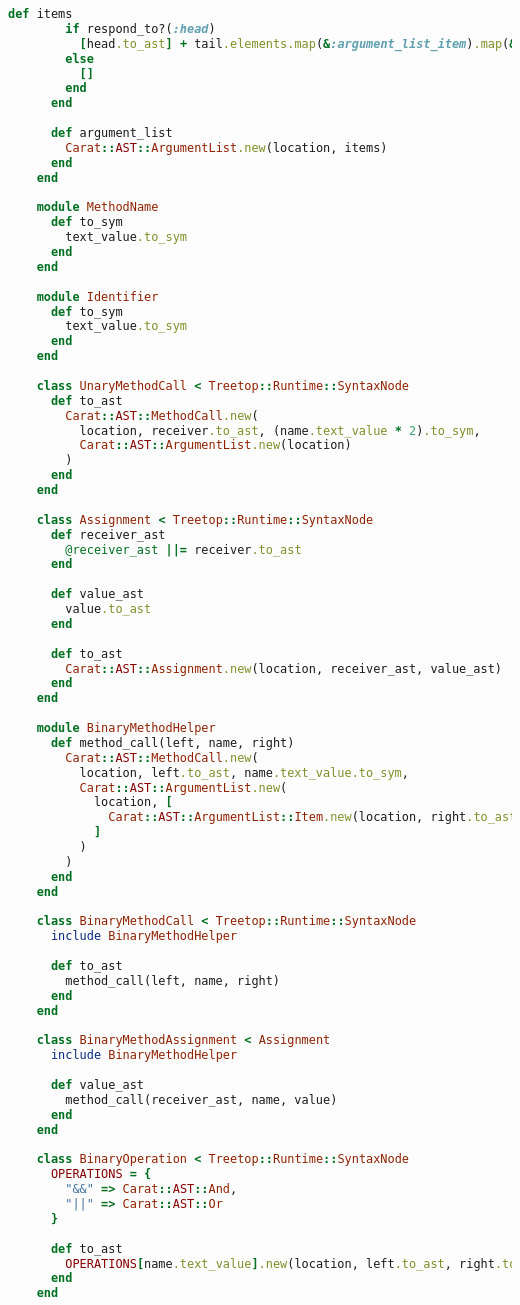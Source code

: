 \begin{lstlisting}[title={\small\ttfamily\bfseries parser/nodes.rb},language=Ruby]
      def items
        if respond_to?(:head)
          [head.to_ast] + tail.elements.map(&:argument_list_item).map(&:to_ast)
        else
          []
        end
      end
      
      def argument_list
        Carat::AST::ArgumentList.new(location, items)
      end
    end
    
    module MethodName
      def to_sym
        text_value.to_sym
      end
    end
    
    module Identifier
      def to_sym
        text_value.to_sym
      end
    end
    
    class UnaryMethodCall < Treetop::Runtime::SyntaxNode
      def to_ast
        Carat::AST::MethodCall.new(
          location, receiver.to_ast, (name.text_value * 2).to_sym,
          Carat::AST::ArgumentList.new(location)
        )
      end
    end
    
    class Assignment < Treetop::Runtime::SyntaxNode
      def receiver_ast
        @receiver_ast ||= receiver.to_ast
      end
      
      def value_ast
        value.to_ast
      end
      
      def to_ast
        Carat::AST::Assignment.new(location, receiver_ast, value_ast)
      end
    end
    
    module BinaryMethodHelper
      def method_call(left, name, right)
        Carat::AST::MethodCall.new(
          location, left.to_ast, name.text_value.to_sym,
          Carat::AST::ArgumentList.new(
            location, [
              Carat::AST::ArgumentList::Item.new(location, right.to_ast)
            ]
          )
        )
      end
    end
    
    class BinaryMethodCall < Treetop::Runtime::SyntaxNode
      include BinaryMethodHelper
      
      def to_ast
        method_call(left, name, right)
      end
    end
    
    class BinaryMethodAssignment < Assignment
      include BinaryMethodHelper
      
      def value_ast
        method_call(receiver_ast, name, value)
      end
    end
    
    class BinaryOperation < Treetop::Runtime::SyntaxNode
      OPERATIONS = {
        "&&" => Carat::AST::And,
        "||" => Carat::AST::Or
      }
      
      def to_ast
        OPERATIONS[name.text_value].new(location, left.to_ast, right.to_ast)
      end
    end
    

\end{lstlisting}
